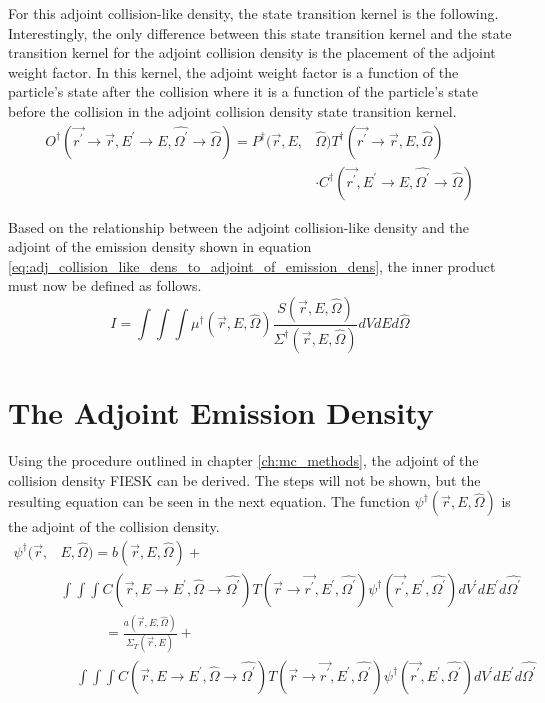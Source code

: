 For this adjoint collision-like density, the state transition kernel is the 
following. Interestingly, the only difference between this state transition
kernel and the state transition kernel for the adjoint collision density is
the placement of the adjoint weight factor. In this kernel, the adjoint
weight factor is a function of the particle's state after the collision where
it is a function of the particle's state before the collision in the adjoint
collision density state transition kernel.
\begin{equation}
  \begin{split}
    O^{\dagger}(\vec{r^{'}} \to \vec{r},E^{'} \to E,\hat{\Omega^{'}} \to \hat{\Omega})
    = P^{\dagger}(\vec{r},E,&\hat{\Omega}) 
    T^{\dagger}(\vec{r^{'}} \to \vec{r},E,\hat{\Omega}) \\
    & \cdot C^{\dagger}(\vec{r^{'}},E^{'} \to E,\hat{\Omega^{'}} \to \hat{\Omega})
  \end{split}
\end{equation}

Based on the relationship between the adjoint collision-like density and the
adjoint of the emission density shown in equation 
\ref{eq:adj_collision_like_dens_to_adjoint_of_emission_dens}, the inner product
must now be defined as follows.
\begin{equation}
  I = \int\int\int \mu^{\dagger}(\vec{r},E,\hat{\Omega})
  \frac{S(\vec{r},E,\hat{\Omega})}{\Sigma^{\dagger}(\vec{r},E,\hat{\Omega})}
  dV dE d\hat{\Omega}
\end{equation}

\section{The Adjoint Emission Density}
Using the procedure outlined in chapter \ref{ch:mc_methods}, the adjoint of the
collision density FIESK can be derived. The steps will not be shown, but the 
resulting equation can be seen in the next equation. The function 
$\psi^{\dagger}(\vec{r},E,\hat{\Omega})$ is the adjoint of the collision density.
\begin{equation*}
  \begin{split}
    \psi^{\dagger}(\vec{r},&E,\hat{\Omega}) = b(\vec{r},E,\hat{\Omega}) + \\
    & \int\int\int C(\vec{r},E \to E^{'},\hat{\Omega} \to \hat{\Omega^{'}})
    T(\vec{r} \to \vec{r^{'}},E^{'},\hat{\Omega^{'}})
    \psi^{\dagger}(\vec{r^{'}},E^{'},\hat{\Omega^{'}}) dV^{'}dE^{'}d\hat{\Omega^{'}}
  \end{split}
\end{equation*}
\begin{equation}
  \begin{split}
    \qquad \quad \text{  } & \qquad = \frac{a(\vec{r},E,\hat{\Omega})}
    {\Sigma_T(\vec{r},E)}+ \\
    & \int\int\int C(\vec{r},E \to E^{'},\hat{\Omega} \to \hat{\Omega^{'}})
    T(\vec{r} \to \vec{r^{'}},E^{'},\hat{\Omega^{'}})
    \psi^{\dagger}(\vec{r^{'}},E^{'},\hat{\Omega^{'}}) dV^{'}dE^{'}d\hat{\Omega^{'}}
  \end{split}
\end{equation}

